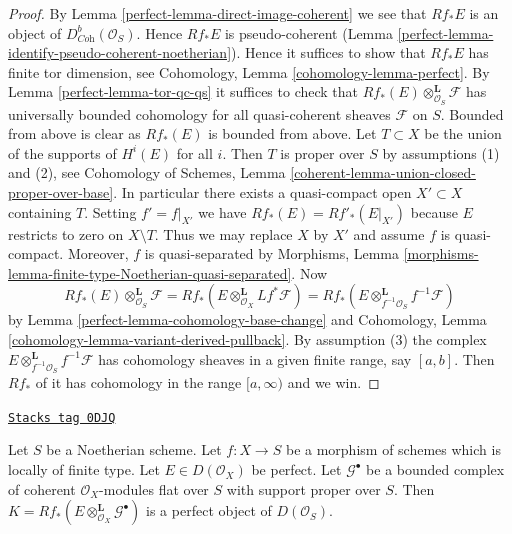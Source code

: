\begin{proof}

By Lemma \ref{perfect-lemma-direct-image-coherent} we see that $Rf_*E$ is an object of
$D^b_{\textit{Coh}}(\mathcal{O}_S)$. Hence $Rf_*E$ is pseudo-coherent
(Lemma \ref{perfect-lemma-identify-pseudo-coherent-noetherian}).
Hence it suffices to show that $Rf_*E$ has finite tor dimension, see
Cohomology, Lemma \ref{cohomology-lemma-perfect}.
By Lemma \ref{perfect-lemma-tor-qc-qs} it suffices to check that
$Rf_*(E) \otimes_{\mathcal{O}_S}^\mathbf{L} \mathcal{F}$
has universally bounded cohomology for all quasi-coherent
sheaves $\mathcal{F}$ on $S$. Bounded from above is clear as $Rf_*(E)$
is bounded from above. Let $T \subset X$ be the union of the supports
of $H^i(E)$ for all $i$. Then $T$ is proper over $S$ by assumptions
(1) and (2), see Cohomology of Schemes, Lemma
\ref{coherent-lemma-union-closed-proper-over-base}.
In particular there exists a quasi-compact open
$X' \subset X$ containing $T$. Setting $f' = f|_{X'}$ we have
$Rf_*(E) = Rf'_*(E|_{X'})$ because $E$ restricts to zero on $X \setminus T$.
Thus we may replace $X$ by $X'$ and assume $f$ is quasi-compact.
Moreover, $f$ is quasi-separated by Morphisms, Lemma
\ref{morphisms-lemma-finite-type-Noetherian-quasi-separated}. Now
$$
Rf_*(E) \otimes_{\mathcal{O}_S}^\mathbf{L} \mathcal{F} =
Rf_*\left(E \otimes_{\mathcal{O}_X}^\mathbf{L} Lf^*\mathcal{F}\right) =
Rf_*\left(E \otimes_{f^{-1}\mathcal{O}_S}^\mathbf{L} f^{-1}\mathcal{F}\right)
$$
by
Lemma \ref{perfect-lemma-cohomology-base-change}
and
Cohomology, Lemma \ref{cohomology-lemma-variant-derived-pullback}.
By assumption (3) the complex
$E \otimes_{f^{-1}\mathcal{O}_S}^\mathbf{L} f^{-1}\mathcal{F}$
has cohomology sheaves in a
given finite range, say $[a, b]$. Then $Rf_*$ of it
has cohomology in the range $[a, \infty)$ and we win.
\end{proof}

\begin{lemma}
\label{perfect-lemma-tensor-perfect}
\href{https://stacks.math.columbia.edu/tag/0DJQ}{\texttt{Stacks tag 0DJQ}}

Let $S$ be a Noetherian scheme. Let $f : X \to S$ be a morphism of schemes
which is locally of finite type. Let $E \in D(\mathcal{O}_X)$ be perfect.
Let $\mathcal{G}^\bullet$ be a bounded complex of coherent
$\mathcal{O}_X$-modules flat over $S$ with support proper over $S$.
Then $K = Rf_*(E \otimes_{\mathcal{O}_X}^\mathbf{L} \mathcal{G}^\bullet)$
is a perfect object of $D(\mathcal{O}_S)$.
\end{lemma}

